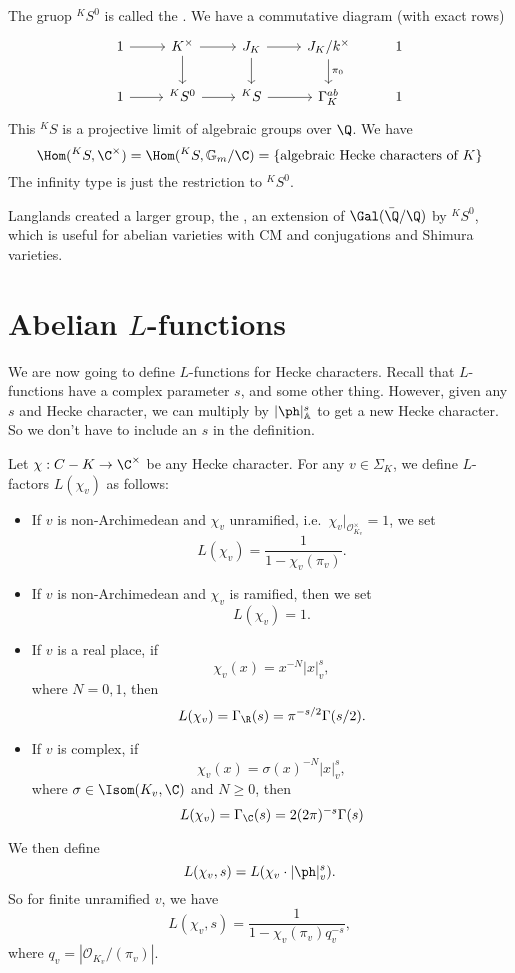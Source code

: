 \documentclass[a4paper]{article}
\renewcommand\G{\mathbb{G}}
\newcommand\A{\mathbb{A}}
\begin{document}
The gruop $^KS^0$ is called the . We have a commutative diagram (with exact rows)
\[
  \begin{tikzcd}
    1 \ar[r] & K^\times \ar[r] \ar[d] & J_K \ar[r] \ar[d] & J_K/k^\times \ar[d, "\pi_0"] & 1\\
    1 \ar[r] & ^KS^0 \ar[r] & ^KS \ar[r] & \Gamma^{ab}_K & 1
  \end{tikzcd}
\]
This $^KS$ is a projective limit of algebraic groups over $\Q$. We have
\[
  \Hom(^KS, \C^\times) = \Hom(^KS, \G_m/\C) = \{\text{algebraic Hecke characters of $K$}\}
\]
The infinity type is just the restriction to $^KS^0$.

Langlands created a larger group, the , an extension of $\Gal(\bar{\Q}/\Q)$ by $^K S^0$, which is useful for abelian varieties with CM and conjugations and Shimura varieties.

\section{Abelian \texorpdfstring{$L$}{L}-functions}
We are now going to define $L$-functions for Hecke characters. Recall that $L$-functions have a complex parameter $s$, and some other thing. However, given any $s$ and Hecke character, we can multiply by $|\ph|_{\A}^s$ to get a new Hecke character. So we don't have to include an $s$ in the definition.

Let $\chi: C-K \to \C^\times$ be any Hecke character. For any $v \in \Sigma_K$, we define $L$-factors $L(\chi_v)$ as follows:
\begin{itemize}
  \item If $v$ is non-Archimedean and $\chi_v$ unramified, i.e.\ $\chi_v|_{\mathcal{O}_{K_v}^\times} = 1$, we set
    \[
      L(\chi_v) = \frac{1}{1 - \chi_v(\pi_v)}.
    \]
  \item If $v$ is non-Archimedean and $\chi_v$ is ramified, then we set
    \[
      L(\chi_v) = 1.
    \]
  \item If $v$ is a real place, if
    \[
      \chi_v(x) = x^{-N} |x|_v^s,
    \]
    where $N = 0, 1$, then
    \[
      L(\chi_v) = \Gamma_\R(s) = \pi^{-s/2} \Gamma(s/2).
    \]
  \item If $v$ is complex, if
    \[
      \chi_v(x) = \sigma(x)^{-N} |x|_v^s,
    \]
    where $\sigma \in \Isom(K_v, \C)$ and $N \geq 0$, then
    \[
      L(\chi_v) = \Gamma_\C(s) = 2 (2\pi)^{-s} \Gamma(s)
    \]
\end{itemize}
We then define
\[
  L(\chi_v, s) = L(\chi_v \cdot |\ph|_v^s).
\]
So for finite unramified $v$, we have
\[
  L(\chi_v, s) = \frac{1}{1 - \chi_v(\pi_v) q_v^{-s}},
\]
where $q_v = |\mathcal{O}_{K_v}/(\pi_v)|$.
\end{document}

